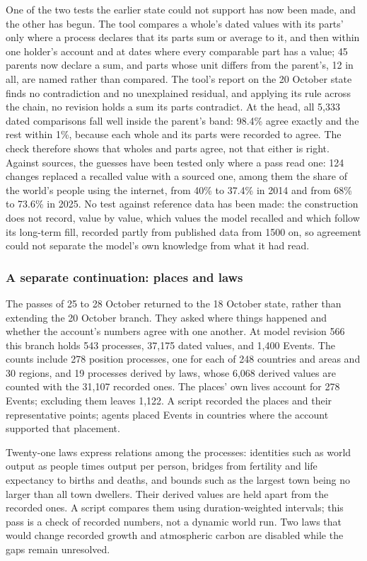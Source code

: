 \documentclass[11pt,a4paper]{article}
\begin{document}
One of the two tests the earlier state could not support has now been made, and
the other has begun. The tool compares a whole's dated values with its parts'
only where a process declares that its parts sum or average to it, and then
within one holder's account and at dates where every comparable part has a value; 45
parents now declare a sum, and parts whose unit differs from the parent's, 12 in
all, are named rather than compared. The tool's report on the 20 October state finds no
contradiction and no unexplained residual, and applying its rule across the
chain, no revision holds a sum its parts contradict. At the head, all 5,333 dated
comparisons fall well inside the parent's band: 98.4\% agree exactly and the rest
within 1\%, because each whole and its parts were recorded to agree. The check
therefore shows that wholes and parts agree, not that either is right. Against
sources, the guesses have been tested only where a
pass read one: 124 changes replaced a recalled value with a sourced one, among
them the share of the world's people using the internet, from 40\% to 37.4\% in
2014 and from 68\% to 73.6\% in 2025. No test against reference data has been
made: the construction does not record, value by value, which values the model
recalled and which follow its long-term fill, recorded partly from published
data from 1500 on, so agreement could not separate the model's own knowledge
from what it had read.

\subsubsection{A separate continuation: places and laws}
\label{sec:world-history-laws}

The passes of 25 to 28 October returned to the 18 October state, rather than
extending the 20 October branch. They asked where things happened and whether the
account's numbers agree with one another. At model revision 566 this branch holds
543 processes, 37,175 dated values, and 1,400 Events. The counts include 278
position processes, one for each of 248 countries and areas and 30 regions, and 19
processes derived by laws, whose 6,068 derived values are counted with the 31,107
recorded ones. The places' own lives account for 278 Events; excluding them leaves
1,122. A script recorded the places and their representative points; agents placed
Events in countries where the account supported that placement.

Twenty-one laws express relations among the processes: identities such as world
output as people times output per person, bridges from fertility and life
expectancy to births and deaths, and bounds such as the largest town being no
larger than all town dwellers. Their derived values are held apart from the
recorded ones. A script compares them using duration-weighted intervals; this
pass is a check of recorded numbers, not a dynamic world run. Two laws that
would change recorded growth and atmospheric carbon are disabled while the gaps
remain unresolved.
\end{document}
